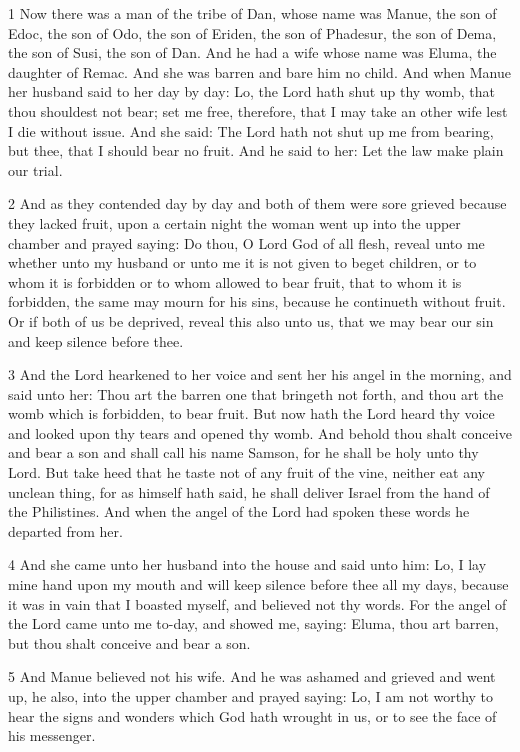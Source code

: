 \par 1 Now there was a man of the tribe of Dan, whose name was Manue, the son of Edoc, the son of Odo, the son of Eriden, the son of Phadesur, the son of Dema, the son of Susi, the son of Dan. And he had a wife whose name was Eluma, the daughter of Remac. And she was barren and bare him no child. And when Manue her husband said to her day by day: Lo, the Lord hath shut up thy womb, that thou shouldest not bear; set me free, therefore, that I may take an other wife lest I die without issue. And she said: The Lord hath not shut up me from bearing, but thee, that I should bear no fruit. And he said to her: Let the law make plain our trial. 

\par 2 And as they contended day by day and both of them were sore grieved because they lacked fruit, upon a certain night the woman went up into the upper chamber and prayed saying: Do thou, O Lord God of all flesh, reveal unto me whether unto my husband or unto me it is not given to beget children, or to whom it is forbidden or to whom allowed to bear fruit, that to whom it is forbidden, the same may mourn for his sins, because he continueth without fruit. Or if both of us be deprived, reveal this also unto us, that we may bear our sin and keep silence before thee. 

\par 3 And the Lord hearkened to her voice and sent her his angel in the morning, and said unto her: Thou art the barren one that bringeth not forth, and thou art the womb which is forbidden, to bear fruit. But now hath the Lord heard thy voice and looked upon thy tears and opened thy womb. And behold thou shalt conceive and bear a son and shall call his name Samson, for he shall be holy unto thy Lord. But take heed that he taste not of any fruit of the vine, neither eat any unclean thing, for as himself hath said, he shall deliver Israel from the hand of the Philistines. And when the angel of the Lord had spoken these words he departed from her. 

\par 4 And she came unto her husband into the house and said unto him: Lo, I lay mine hand upon my mouth and will keep silence before thee all my days, because it was in vain that I boasted myself, and believed not thy words. For the angel of the Lord came unto me to-day, and showed me, saying: Eluma, thou art barren, but thou shalt conceive and bear a son. 

\par 5 And Manue believed not his wife. And he was ashamed and grieved and went up, he also, into the upper chamber and prayed saying: Lo, I am not worthy to hear the signs and wonders which God hath wrought in us, or to see the face of his messenger. 

